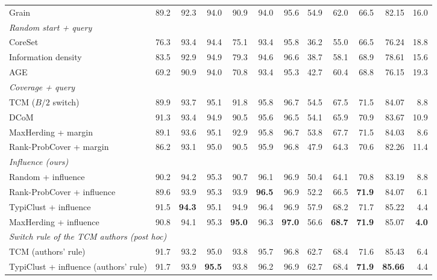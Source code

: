 \begin{table}[t]
\begin{adjustbox}{max width=\textwidth}
\begin{tabular}{lrrrrrrrrrrr}
\quad Grain~\cite{zhang2021grain} & 89.2 & 92.3 & 94.0 & 90.9 & 94.0 & 95.6 & 54.9 & 62.0 & 66.5 & 82.15 & 16.0 \\
\multicolumn{12}{l}{\textit{Random start + query}} \\
\quad CoreSet~\cite{sener2017active} & 76.3 & 93.4 & 94.4 & 75.1 & 93.4 & 95.8 & 36.2 & 55.0 & 66.5 & 76.24 & 18.8 \\
\quad Information density~\cite{settles2008analysis} & 83.5 & 92.9 & 94.9 & 79.3 & 94.6 & 96.6 & 38.7 & 58.1 & 68.9 & 78.61 & 15.6 \\
\quad AGE~\cite{cai2017active} & 69.2 & 90.9 & 94.0 & 70.8 & 93.4 & 95.3 & 42.7 & 60.4 & 68.8 & 76.15 & 19.3 \\
\multicolumn{12}{l}{\textit{Coverage + query}} \\
\quad TCM ($B/2$ switch)~\cite{doucet2024bridging} & 89.9 & 93.7 & 95.1 & 91.8 & 95.8 & 96.7 & 54.5 & 67.5 & 71.5 & 84.07 & 8.8 \\
\quad DCoM~\cite{mishal2024dcom} & 91.3 & 93.4 & 94.9 & 90.5 & 95.6 & 96.5 & 54.1 & 65.9 & 70.9 & 83.67 & 10.9 \\
\quad MaxHerding + margin & 89.1 & 93.6 & 95.1 & 92.9 & 95.8 & 96.7 & 53.8 & 67.7 & 71.5 & 84.03 & 8.6 \\
\quad Rank-ProbCover + margin & 86.2 & 93.1 & 95.0 & 90.5 & 95.9 & 96.8 & 47.9 & 64.3 & 70.6 & 82.26 & 11.4 \\
\multicolumn{12}{l}{\textit{Influence (ours)}} \\
\quad Random + influence & 90.2 & 94.2 & 95.3 & 90.7 & 96.1 & 96.9 & 50.4 & 64.1 & 70.8 & 83.19 & 8.8 \\
\quad Rank-ProbCover + influence & 89.6 & 93.9 & 95.3 & 93.9 & \textbf{96.5} & 96.9 & 52.2 & 66.5 & \textbf{71.9} & 84.07 & 6.1 \\
\quad TypiClust + influence & 91.5 & \textbf{94.3} & 95.1 & 94.9 & 96.4 & 96.9 & 57.9 & 68.2 & 71.7 & 85.22 & 4.4 \\
\quad MaxHerding + influence & 90.8 & 94.1 & 95.3 & \textbf{95.0} & 96.3 & \textbf{97.0} & 56.6 & \textbf{68.7} & \textbf{71.9} & 85.07 & \textbf{4.0} \\
\multicolumn{12}{l}{\textit{Switch rule of the TCM authors (post hoc)}} \\
\quad TCM (authors' rule)~\cite{doucet2024bridging} & 91.7 & 93.2 & 95.0 & 93.8 & 95.7 & 96.8 & 62.7 & 68.4 & 71.6 & 85.43 & 6.4 \\
\quad TypiClust + influence (authors' rule) & 91.7 & 93.9 & \textbf{95.5} & 93.8 & 96.2 & 96.9 & 62.7 & 68.4 & \textbf{71.9} & \textbf{85.66} & 4.4 \\
\bottomrule
\end{tabular}
\end{adjustbox}
\end{table}
